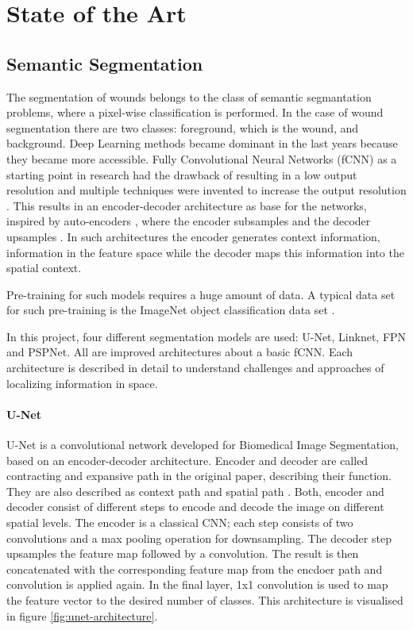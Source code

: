 \section{State of the Art}

\subsection{Semantic Segmentation}

The segmentation of wounds belongs to the class of semantic segmantation problems, where a pixel-wise classification is performed. In the case of wound segmentation there are two classes: foreground, which is the wound, and background. Deep Learning methods became dominant in the last years because they became more accessible. Fully Convolutional Neural Networks (fCNN) as a starting point in research had the drawback of resulting in a low output resolution and multiple techniques were invented to increase the output resolution \cite{Litjens2017}. This results in an encoder-decoder architecture as base for the networks, inspired by auto-encoders \cite{linknet}, where the encoder subsamples and the decoder upsamples \cite{Norelyaqine2023}. In such architectures the encoder generates context information, information in the feature space while the decoder maps this information into the spatial context.

Pre-training for such models requires a huge amount of data. A typical data set for such pre-training is the ImageNet object classification data set \cite{SegNet}.

In this project, four different segmentation models are used: U-Net, Linknet, FPN and PSPNet. All are improved architectures about a basic fCNN. Each architecture is described in detail to understand challenges and approaches of localizing information in space.

\paragraph{U-Net}

U-Net is a convolutional network developed for Biomedical Image Segmentation, based on an encoder-decoder architecture. Encoder and decoder are called contracting and expansive path in the original paper, describing their function. They are also described as context path and spatial path \cite{MO2022626}. Both, encoder and decoder consist of different steps to encode and decode the image on different spatial levels. The encoder is a classical CNN; each step consists of two convolutions and a max pooling operation for downsampling. The decoder step upsamples the feature map followed by a convolution. The result is then concatenated with the corresponding feature map from the encdoer path and convolution is applied again. In the final layer, 1x1 convolution is used to map the feature vector to the desired number of classes. This architecture is visualised in figure \ref{fig:unet-architecture}. \cite{unet}

